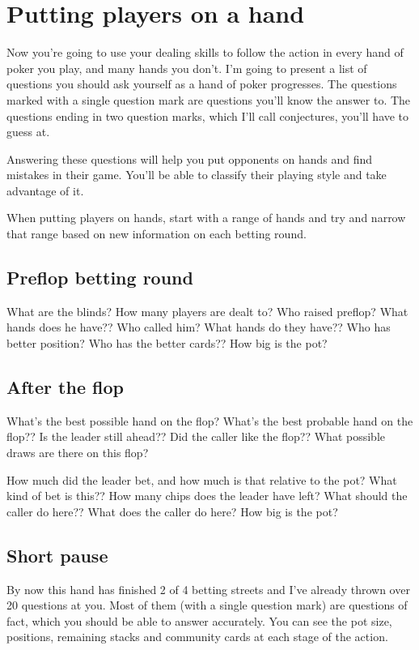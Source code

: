 \chapter{Putting players on a hand}


Now you're going to use your dealing skills to follow the action in
every hand of poker you play, and many hands you don't. I'm going
to present a list of questions you should ask yourself as
a hand of poker progresses. The questions marked with a single question
mark are questions you'll know the answer to. The questions ending
in two question marks, which I'll call conjectures, you'll have to guess at.

Answering these questions will help you put opponents on hands and
find mistakes in their game. You'll be able to classify their
playing style and take advantage of it.

When putting players on hands, start with a range of hands
and try and narrow that range based on new information on each
betting round.

\section{Preflop betting round}

What are the blinds? How many players are dealt to? Who raised preflop? 
What hands does he have?? Who called him? What hands do they have?? 
Who has better position? Who has the better cards?? How big is the pot?

\section{After the flop}

What's the best possible hand on the flop? What's the best probable
hand on the flop?? Is the leader still ahead?? Did the caller
like the flop?? What possible draws are there on this flop?

How much did the leader bet, and how much is that relative to the pot?
What kind of bet is this?? How many chips does the leader have left?
What should the caller do here?? What does the caller do here? How
big is the pot?

\section{Short pause}

By now this hand has finished 2 of 4 betting streets and I've already
thrown over 20 questions at you. Most of them (with a single
question mark) are questions of fact, which you
should be able to answer accurately. You can see the pot size, positions,
remaining stacks and community cards at each stage of the action.

